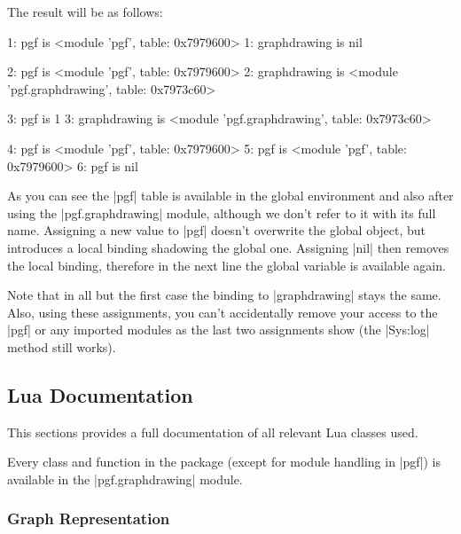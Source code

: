 The result will be as follows:

\begin{codeexample}
1: pgf is <module 'pgf', table: 0x7979600>
1: graphdrawing is nil

2: pgf is <module 'pgf', table: 0x7979600>
2: graphdrawing is <module 'pgf.graphdrawing', table: 0x7973c60>

3: pgf is 1
3: graphdrawing is <module 'pgf.graphdrawing', table: 0x7973c60>

4: pgf is <module 'pgf', table: 0x7979600>
5: pgf is <module 'pgf', table: 0x7979600>
6: pgf is nil
\end{codeexample}

As you can see the |pgf| table is available in the global environment
and also after using the |pgf.graphdrawing| module, although we don't
refer to it with its full name.  Assigning a new value to |pgf|
doesn't overwrite the global object, but introduces a local binding
shadowing the global one. Assigning |nil| then removes the local
binding, therefore in the next line the global variable is available
again.

Note that in all but the first case the binding to |graphdrawing|
stays the same.  Also, using these assignments, you can't accidentally
remove your access to the |pgf| or any imported modules as the last
two assignments show (the |Sys:log| method still works).

\subsection{Lua Documentation}
This sections provides a full documentation of all relevant Lua classes
used.

Every class and function in the package (except for module handling in
|pgf|) is available in the |pgf.graphdrawing| module.

\label{section-library-graphdrawing-lua-documentation}
\subsubsection{Graph Representation}
\label{section-library-graphdrawing-lua-documentation-graphrep}






%


